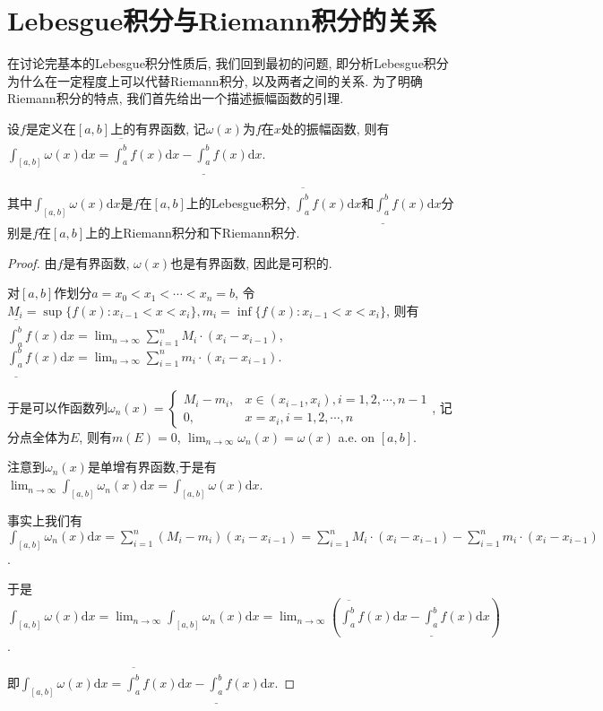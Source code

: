 \documentclass[theorem=false,mathfont=none,openany,sub3section]{easybook}
\begin{document}
\newpage

\section{Lebesgue积分与Riemann积分的关系}

在讨论完基本的Lebesgue积分性质后, 我们回到最初的问题, 即分析Lebesgue积分为什么在一定程度上可以代替Riemann积分, 以及两者之间的关系. 为了明确Riemann积分的特点, 我们首先给出一个描述振幅函数的引理.\par

\begin{lemma}
  设$f$是定义在$[a,b]$上的有界函数, 记$\omega(x)$为$f$在$x$处的振幅函数, 则有$\int_{[a,b]}\omega(x)\mathrm{d}x=\overline{\int_{a}^{b}}f(x)\mathrm{d}x-\underline{\int_{a}^{b}}f(x)\mathrm{d}x$.\par
  其中$\int_{[a,b]}\omega(x)\mathrm{d}x$是$f$在$[a,b]$上的Lebesgue积分, $\overline{\int_{a}^{b}}f(x)\mathrm{d}x$和$\underline{\int_{a}^{b}}f(x)\mathrm{d}x$分别是$f$在$[a,b]$上的上Riemann积分和下Riemann积分.\par
\end{lemma}

\begin{proof}
  由$f$是有界函数, $\omega(x)$也是有界函数, 因此是可积的.\par
  对$[a,b]$作划分$a=x_0<x_1<\cdots<x_n=b$, 令$M_i=\sup \{f(x): x_{i-1}<x<x_{i}\}, m_i=\inf \{f(x): x_{i-1}<x<x_{i}\}$, 则有$\overline{\int_{a}^{b}}f(x)\mathrm{d}x=\lim_{n \to \infty}\sum_{i=1}^{n}M_i\cdot (x_i-x_{i-1})$, $\underline{\int_{a}^{b}}f(x)\mathrm{d}x=\lim_{n \to \infty}\sum_{i=1}^{n}m_i\cdot (x_i-x_{i-1})$.\par
  于是可以作函数列$\omega_{n}(x)=\begin{cases}
    M_i-m_i, & x\in (x_{i-1},x_i), i=1,2,\cdots,n-1\\
    0, & x=x_i, i=1,2,\cdots,n
  \end{cases}$, 记分点全体为$E$, 则有$m(E)=0$, $\lim_{n \to \infty}\omega_{n}(x)=\omega(x)$ a.e. on $[a,b]$.\par
  注意到$\omega_{n}(x)$是单增有界函数,于是有$\lim_{n \to \infty}\int_{[a,b]}\omega_{n}(x)\mathrm{d}x=\int_{[a,b]}\omega(x)\mathrm{d}x$.\par
  事实上我们有$\int_{[a,b]}\omega_{n}(x)\mathrm{d}x=\sum_{i=1}^{n}(M_i-m_i)(x_i-x_{i-1})=\sum_{i=1}^{n}M_i\cdot (x_i-x_{i-1})-\sum_{i=1}^{n}m_i\cdot (x_i-x_{i-1})$.\par
  于是$\int_{[a,b]}\omega(x)\mathrm{d}x=\lim_{n \to \infty}\int_{[a,b]}\omega_{n}(x)\mathrm{d}x=\lim_{n \to \infty}\left(\overline{\int_{a}^{b}}f(x)\mathrm{d}x-\underline{\int_{a}^{b}}f(x)\mathrm{d}x\right)$.\par
  即$\int_{[a,b]}\omega(x)\mathrm{d}x=\overline{\int_{a}^{b}}f(x)\mathrm{d}x-\underline{\int_{a}^{b}}f(x)\mathrm{d}x$.\par
\end{proof}
\end{document}
